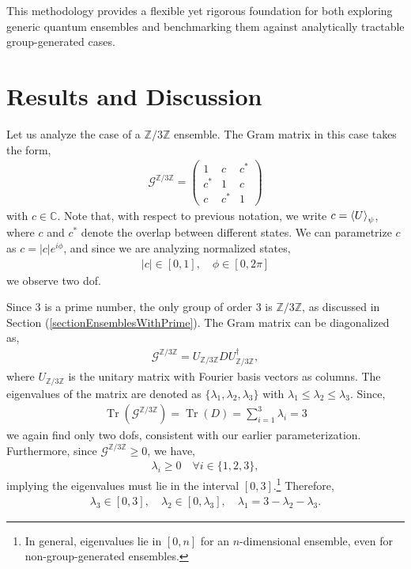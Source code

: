 \documentclass[12pt,letterpaper]{article}
\DeclareMathOperator{\tr}{Tr}
\begin{document}
\begin{multicols}{2}
This methodology provides a flexible yet rigorous foundation for both exploring generic quantum ensembles and benchmarking them against analytically tractable group-generated cases.

\section{Results and Discussion}

Let us analyze the case of a $\mathbb{Z}/3\mathbb{Z}$ ensemble. The Gram matrix in this case takes the form,
\begin{align*}
	\mathcal{G}^{\mathbb{Z}/3\mathbb{Z}}=\begin{pmatrix}
		1 & c & c^*\\
		c^* & 1 & c\\
		c & c^* & 1
	\end{pmatrix}
\end{align*}
with $c \in \mathbb{C}$. Note that, with respect to previous notation, we write $c = \braket{U}_{\psi}$, where $c$ and $c^*$ denote the overlap between different states. We can parametrize $c$ as $c = |c|e^{i\phi}$, and since we are analyzing normalized states,
\begin{align*}
	|c|\in [0,1], \quad \phi\in[0,2\pi]
\end{align*}
we observe two \gls{dof}.

Since 3 is a prime number, the only group of order 3 is $\mathbb{Z}/3\mathbb{Z}$, as discussed in Section (\ref{sectionEnsemblesWithPrime}). The Gram matrix can be diagonalized as,
\begin{align*}
	\mathcal{G}^{\mathbb{Z}/3\mathbb{Z}} = U_{\mathbb{Z}/3\mathbb{Z}} D U_{\mathbb{Z}/3\mathbb{Z}}^\dagger,
\end{align*}
where $U_{\mathbb{Z}/3\mathbb{Z}}$ is the unitary matrix with Fourier basis vectors as columns. The eigenvalues of the matrix are denoted as $\{\lambda_1,\lambda_2,\lambda_3\}$ with $\lambda_1 \leq \lambda_2 \leq \lambda_3$. Since,
\begin{align*}
	\tr(\mathcal{G}^{\mathbb{Z}/3\mathbb{Z}}) = \tr(D) = \sum_{i=1}^3 \lambda_i = 3
\end{align*}
we again find only two \glspl{dof}, consistent with our earlier parameterization. Furthermore, since $\mathcal{G}^{\mathbb{Z}/3\mathbb{Z}} \geq 0$, we have,
\begin{align*}
	\lambda_i \geq 0 \quad \forall i \in \{1,2,3\},
\end{align*}
implying the eigenvalues must lie in the interval $[0,3]$.\footnote{In general, eigenvalues lie in $[0,n]$ for an $n$-dimensional ensemble, even for non-group-generated ensembles.} Therefore,
\begin{align*}
	\lambda_3 \in [0,3], \quad \lambda_2 \in [0,\lambda_3], \quad \lambda_1 = 3 - \lambda_2 - \lambda_3.
\end{align*}


\end{multicols}
\end{document}
